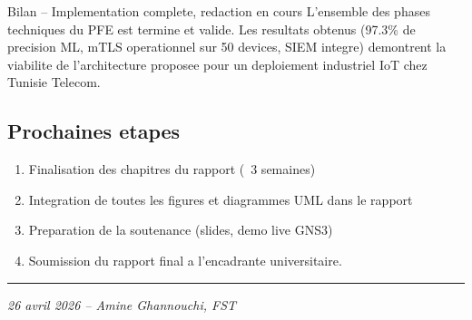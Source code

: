 \documentclass[a4paper,11pt]{article}
\begin{document}
\begin{resultbox}{Bilan -- Implementation complete, redaction en cours}
  L'ensemble des phases techniques du PFE est termine et valide. Les resultats
  obtenus (97.3\% de precision ML, mTLS operationnel sur 50 devices, SIEM
  integre) demontrent la viabilite de l'architecture proposee pour un
  deploiement industriel IoT chez Tunisie Telecom.
\end{resultbox}

\subsection{Prochaines etapes}

\begin{enumerate}[leftmargin=1.5em]
  \item Finalisation des chapitres du rapport (~3 semaines)
  \item Integration de toutes les figures et diagrammes UML dans le rapport
  \item Preparation de la soutenance (slides, demo live GNS3)
  \item Soumission du rapport final a l'encadrante universitaire.
\end{enumerate}

\vspace{1.5cm}
\noindent\rule{\textwidth}{0.4pt}
{\small\textit{26 avril 2026 -- Amine Ghannouchi, FST}}
\end{document}
